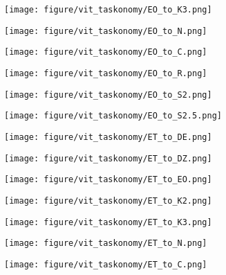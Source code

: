 \begin{figure}[h]
\begin{subfigure}{\figlength\textwidth}
\texttt{[image: figure/vit\_taskonomy/EO\_to\_K3.png]}
\end{subfigure}
\begin{subfigure}{\figlength\textwidth}
\texttt{[image: figure/vit\_taskonomy/EO\_to\_N.png]}
\end{subfigure}
\begin{subfigure}{\figlength\textwidth}
\texttt{[image: figure/vit\_taskonomy/EO\_to\_C.png]}
\end{subfigure}
\begin{subfigure}{\figlength\textwidth}
\texttt{[image: figure/vit\_taskonomy/EO\_to\_R.png]}
\end{subfigure}
\begin{subfigure}{\figlength\textwidth}
\texttt{[image: figure/vit\_taskonomy/EO\_to\_S2.png]}
\end{subfigure}
\begin{subfigure}{\figlength\textwidth}
\texttt{[image: figure/vit\_taskonomy/EO\_to\_S2.5.png]}
\end{subfigure}
\begin{subfigure}{\figlength\textwidth}
\texttt{[image: figure/vit\_taskonomy/ET\_to\_DE.png]}
\end{subfigure}
\begin{subfigure}{\figlength\textwidth}
\texttt{[image: figure/vit\_taskonomy/ET\_to\_DZ.png]}
\end{subfigure}
\begin{subfigure}{\figlength\textwidth}
\texttt{[image: figure/vit\_taskonomy/ET\_to\_EO.png]}
\end{subfigure}
\begin{subfigure}{\figlength\textwidth}
\texttt{[image: figure/vit\_taskonomy/ET\_to\_K2.png]}
\end{subfigure}
\begin{subfigure}{\figlength\textwidth}
\texttt{[image: figure/vit\_taskonomy/ET\_to\_K3.png]}
\end{subfigure}
\begin{subfigure}{\figlength\textwidth}
\texttt{[image: figure/vit\_taskonomy/ET\_to\_N.png]}
\end{subfigure}
\begin{subfigure}{\figlength\textwidth}
\texttt{[image: figure/vit\_taskonomy/ET\_to\_C.png]}
\end{subfigure}

\end{figure}
